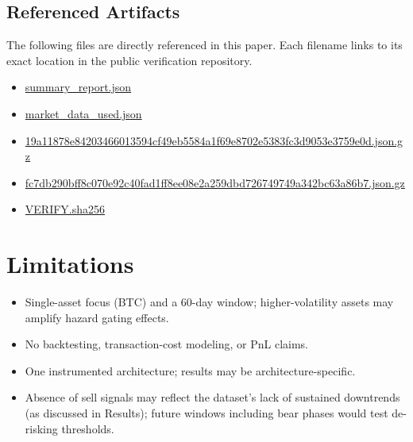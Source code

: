 \documentclass[12pt,a4paper]{report}
\begin{document}
\subsection*{Referenced Artifacts}

The following files are directly referenced in this paper. Each filename links to its exact location in the public verification repository.

\begin{itemize}
  \item \href{https://github.com/jhcragin/SpiralBrain-v3.0-public/blob/main/market_emotion_risk_posture/results/summary_report.json}{summary_report.json}
  \item \href{https://github.com/jhcragin/SpiralBrain-v3.0-public/blob/main/market_emotion_risk_posture/results/provenance/market_data_used.json}{market_data_used.json}
  \item \href{https://github.com/jhcragin/SpiralBrain-v3.0-public/blob/main/market_emotion_risk_posture/results/provenance/raw/19a11878e84203466013594cf49eb5584a1f69e8702e5383fc3d9053e3759e0d.json.gz}{19a11878e84203466013594cf49eb5584a1f69e8702e5383fc3d9053e3759e0d.json.gz}
  \item \href{https://github.com/jhcragin/SpiralBrain-v3.0-public/blob/main/market_emotion_risk_posture/results/provenance/raw/fc7db290bff8c070e92c40fad1ff8ee08e2a259dbd726749749a342bc63a86b7.json.gz}{fc7db290bff8c070e92c40fad1ff8ee08e2a259dbd726749749a342bc63a86b7.json.gz}
  \item \href{https://github.com/jhcragin/SpiralBrain-v3.0-public/blob/main/market_emotion_risk_posture/results/VERIFY.sha256}{VERIFY.sha256}
\end{itemize}

\section{Limitations}

\begin{itemize}
	\item Single-asset focus (BTC) and a 60-day window; higher-volatility assets may amplify hazard gating effects.
	\item No backtesting, transaction-cost modeling, or PnL claims.
	\item One instrumented architecture; results may be architecture-specific.
	\item Absence of sell signals may reflect the dataset's lack of sustained downtrends (as discussed in Results); future windows including bear phases would test de-risking thresholds.
\end{itemize}
\end{document}

